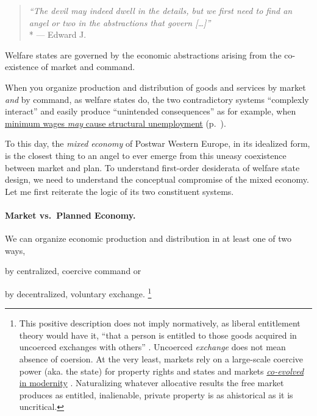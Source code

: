 \begin{quote}
	\emph{``The devil may indeed dwell in the details, but we first need to find an angel or two in the abstractions that govern [\ldots]''}
	\\*
	--- Edward J.\ \citet[K117]{McCaffery2002}
\end{quote}

Welfare states are governed by the economic abstractions arising from the co-existence of market and command.

When you organize production and distribution of goods and services by market \emph{and} by command, as welfare states do, the two contradictory systems ``complexly interact'' \citep{Perrow-1999-aa} and easily produce ``unintended consequences'' \citep{Merton-1936-aa} as for example, when \hyperref[sec:price-floors]{minimum wages \emph{may} cause structural unemployment} (p.~\pageref{sec:price-floors}).

To this day, the \emph{mixed economy} of Postwar Western Europe, in its idealized form, is the closest thing to an angel to ever emerge from this uneasy coexistence between market and plan.
To understand first-order desiderata of welfare state design, we need to understand the conceptual compromise of the mixed economy.
Let me first reiterate the logic of its two constituent systems.

\paragraph[Market vs.\ Plan]{Market vs.\ Planned Economy.}
	\label{sec:market-vs-command}

We can organize economic production and distribution in at least one of two ways,
\begin{inparaenum}
	\item by centralized, coercive command or

	\item by decentralized, voluntary exchange.
	\footnote{
	\label{fn:tilly} This positive description does not imply normatively, as liberal entitlement theory would have it, ``that a person is entitled to those goods acquired in uncoerced exchanges with others'' \citep[149]{Nozick1974,Friedman1962}.
	Uncoerced \emph{exchange} does not mean absence of coersion.
	At the very least, markets rely on a large-scale coercive power (aka. the state) for property rights and states and markets \hyperref[sec:modernity]{\emph{co-evolved} in modernity} \citep{Tilly-1985-aa}.
	Naturalizing whatever allocative results the free market produces as entitled, inalienable, private property is as ahistorical as it is uncritical.
	}
\end{inparaenum}

